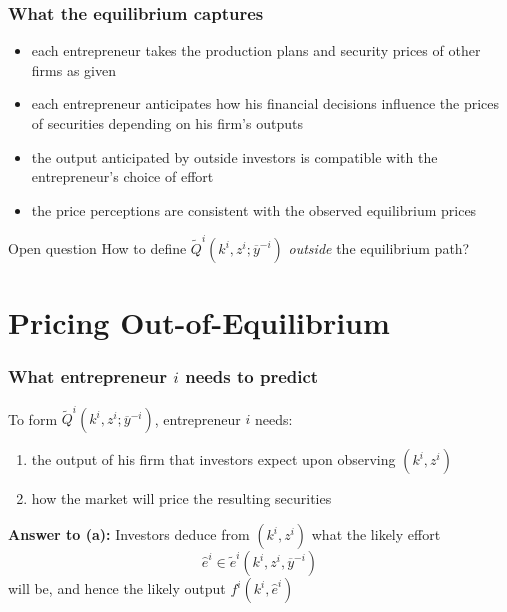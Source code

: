 \documentclass[blue]{beamer}
\theoremstyle{definition}
\theoremstyle{example}
\begin{document}
\begin{frame}\frametitle{What the equilibrium captures}
\begin{itemize}
\item each entrepreneur takes the production plans and security prices of other firms as given
\item each entrepreneur anticipates how his financial decisions influence the prices of securities depending on his firm's outputs
\item the output anticipated by outside investors is compatible with the entrepreneur's choice of effort
\item the price perceptions are consistent with the observed equilibrium prices
\end{itemize}
\bigskip

\begin{block}{Open question}
How to define $\widetilde{Q}^i(k^i, z^i; \overline{y}^{-i})$ \emph{outside} the equilibrium path?
\end{block}
\end{frame}

\section{Pricing Out-of-Equilibrium}

\begin{frame}\frametitle{What entrepreneur $i$ needs to predict}
To form $\widetilde{Q}^i(k^i, z^i; \overline{y}^{-i})$, entrepreneur $i$ needs:
\bigskip

\begin{enumerate}
\item[(a)] the \alert{output} of his firm that investors expect upon observing $(k^i, z^i)$
\bigskip
\item[(b)] how the market will \alert{price} the resulting securities
\end{enumerate}
\bigskip

\textbf{Answer to (a):} Investors deduce from $(k^i, z^i)$ what the likely effort
\begin{equation*}
\widehat{e}^i \in \widetilde{e}^i(k^i, z^i, \overline{y}^{-i})
\end{equation*}
will be, and hence the likely output $f^i(k^i, \widehat{e}^i)$
\end{frame}
\end{document}

